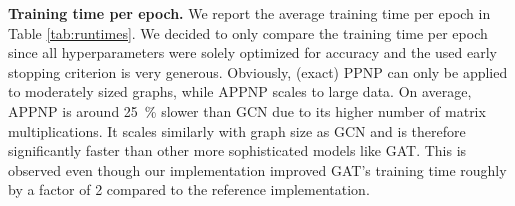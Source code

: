 \documentclass{article} \usepackage{iclr2019_conference,times}
\begin{document}
\textbf{Training time per epoch.} We report the average training time per epoch in Table \ref{tab:runtimes}. We decided to only compare the training time per epoch since all hyperparameters were solely optimized for accuracy and the used early stopping criterion is very generous.
Obviously, (exact) PPNP can only be applied to moderately sized graphs, while APPNP scales to large data.
On average, APPNP is around \SI{25}{\percent} slower than GCN due to its higher number of matrix multiplications. It scales similarly with graph size as GCN and is therefore significantly faster than other more sophisticated models like GAT. This is observed even though our implementation improved GAT's training time roughly by a factor of 2 compared to the reference implementation.

\begin{figure}
    \centering

\end{figure}
\end{document}
